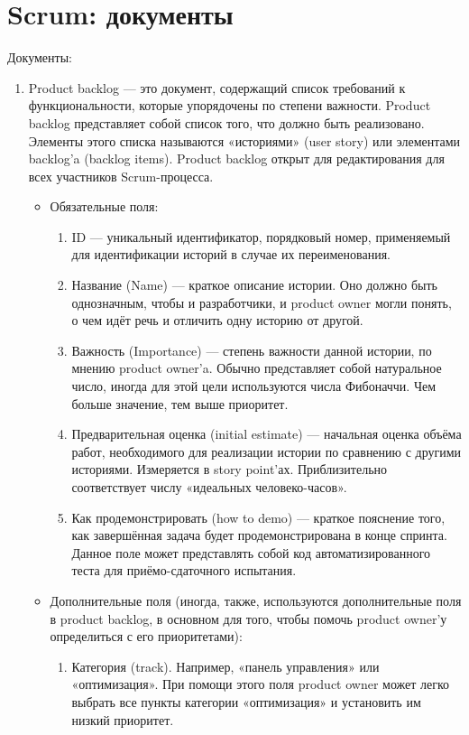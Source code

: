\documentclass{article}
\let\stdsection\section
\renewcommand\section{\newpage\stdsection}
\begin{document}
\section{Scrum: документы}
    Документы:
    \begin{enumerate}
        \item Product backlog — это документ, содержащий список требований к функциональности, которые упорядочены по степени важности. Product backlog представляет собой список того, что должно быть реализовано. Элементы этого списка называются «историями» (user story) или элементами backlog’a (backlog items). Product backlog открыт для редактирования для всех участников Scrum-процесса.
        \begin{itemize}
            \item Обязательные поля:
            \begin{enumerate}
                \item ID — уникальный идентификатор, порядковый номер, применяемый для идентификации историй в случае их переименования.
                \item Название (Name) — краткое описание истории. Оно должно быть однозначным, чтобы и разработчики, и product owner могли понять, о чем идёт речь и отличить одну историю от другой.
                \item Важность (Importance) — степень важности данной истории, по мнению product owner’a. Обычно представляет собой натуральное число, иногда для этой цели используются числа Фибоначчи. Чем больше значение, тем выше приоритет.
                \item Предварительная оценка (initial estimate) — начальная оценка объёма работ, необходимого для реализации истории по сравнению с другими историями. Измеряется в story point’ах. Приблизительно соответствует числу «идеальных человеко-часов».
                \item Как продемонстрировать (how to demo) — краткое пояснение того, как завершённая задача будет продемонстрирована в конце спринта. Данное поле может представлять собой код автоматизированного теста для приёмо-сдаточного испытания.
            \end{enumerate}
            \item Дополнительные поля (иногда, также, используются дополнительные поля в product backlog, в основном для того, чтобы помочь product owner’у определиться с его приоритетами):
            \begin{enumerate}
                \item Категория (track). Например, «панель управления» или «оптимизация». При помощи этого поля product owner может легко выбрать все пункты категории «оптимизация» и установить им низкий приоритет.

\end{enumerate}
\end{itemize}
\end{enumerate}
\end{document}
